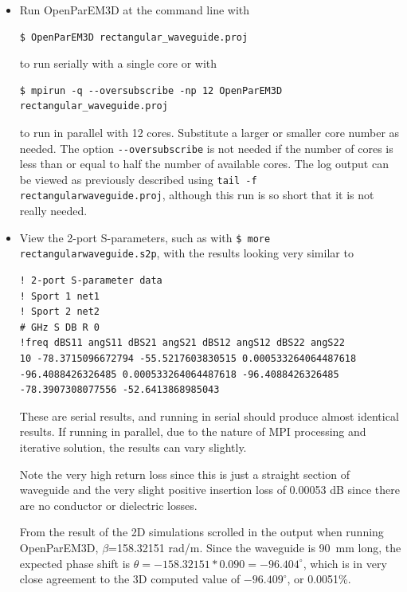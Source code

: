 \documentclass[titlepage]{article}
\renewcommand\_{\textunderscore\linebreak[1]}
\begin{document}
\begin{itemize}
\item Run OpenParEM3D at the command line with
\begin{Verbatim}[fontsize=\small]
   $ OpenParEM3D rectangular_waveguide.proj
\end{Verbatim}
to run serially with a single core or with
\begin{Verbatim}[fontsize=\small]
   $ mpirun -q --oversubscribe -np 12 OpenParEM3D rectangular_waveguide.proj
\end{Verbatim}
to run in parallel with 12 cores.  Substitute a larger or smaller core number as needed.  The option \verb+--oversubscribe+ is not needed if the number of cores is less than or equal to half the number of available cores.  The log output can be viewed as previously described using \texttt{tail -f rectangular\_waveguide.proj}, although this run is so short that it is not really needed.
\item View the 2-port S-parameters, such as with \texttt{\$ more rectangular\_waveguide.s2p}, with the results looking very similar to 
\begin{Verbatim}[fontsize=\tiny]
! 2-port S-parameter data
! Sport 1 net1
! Sport 2 net2
# GHz S DB R 0
!freq dBS11 angS11 dBS21 angS21 dBS12 angS12 dBS22 angS22
10 -78.3715096672794 -55.5217603830515 0.000533264064487618 -96.4088426326485 0.000533264064487618 -96.4088426326485 -78.3907308077556 -52.6413868985043
\end{Verbatim}
These are serial results, and running in serial should produce almost identical results.  If running in parallel, due to the nature of MPI processing and iterative solution, the results can vary slightly.

Note the very high return loss since this is just a straight section of waveguide and the very slight positive insertion loss of 0.00053 dB since there are no conductor or dielectric losses.

From the result of the 2D simulations scrolled in the output when running OpenParEM3D, $\beta$=158.32151 rad/m.  Since the waveguide is 90~mm long, the expected phase shift is
 $\theta=-158.32151*0.090=-96.404^\circ$,
 which is in very close agreement to the 3D computed value of $-96.409^\circ$, or 0.0051\%.


\end{itemize}
\end{document}
